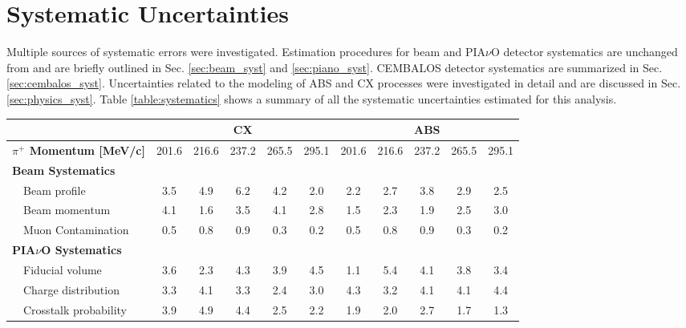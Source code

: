 \section{\label{sec:uncertainties}Systematic Uncertainties}
Multiple sources of systematic errors were investigated. Estimation procedures for beam and PIA$\nu$O detector systematics are unchanged from \cite{duet} and are briefly outlined in Sec. \ref{sec:beam_syst} and \ref{sec:piano_syst}. CEMBALOS detector systematics are summarized in Sec. \ref{sec:cembalos_syst}. Uncertainties related to the modeling of ABS and CX processes were investigated in detail and are discussed in Sec. \ref{sec:physics_syst}. Table \ref{table:systematics} shows a summary of all the systematic uncertainties estimated for this analysis.

\begin{table}[htbp]
\begin{center}
\begin{tabular*}{\textwidth}{l|@{\extracolsep{\fill}}ccccc|ccccc}
\hline\hline
& \multicolumn{5}{c}{CX} & \multicolumn{5}{c}{ABS} \\
\hline
{\bfseries$\pi^+$ Momentum [MeV/c]}& 201.6 & 216.6 & 237.2 & 265.5 & 295.1 & 201.6 & 216.6 & 237.2 & 265.5 & 295.1 \\
\hline
  {\bfseries Beam Systematics} & & & & &  & & & & &\\
  ~~Beam profile& 3.5& 4.9& 6.2& 4.2& 2.0& 2.2& 2.7& 3.8& 2.9& 2.5 \\
  ~~Beam momentum& 4.1& 1.6& 3.5& 4.1& 2.8& 1.5& 2.3& 1.9& 2.5& 3.0 \\
  ~~Muon Contamination& 0.5& 0.8& 0.9& 0.3& 0.2& 0.5& 0.8& 0.9& 0.3& 0.2 \\
  \hline
  {\bfseries PIA$\nu$O Systematics} & & & & &  & & & & &\\
  ~~Fiducial volume& 3.6& 2.3& 4.3& 3.9& 4.5& 1.1& 5.4& 4.1& 3.8& 3.4 \\
  ~~Charge distribution& 3.3& 4.1& 3.3& 2.4& 3.0& 4.3& 3.2& 4.1& 4.1& 4.4 \\
  ~~Crosstalk probability& 3.9& 4.9& 4.4& 2.5& 2.2& 1.9& 2.0& 2.7& 1.7& 1.3 \\

\end{tabular*}
\end{center}
\end{table}
